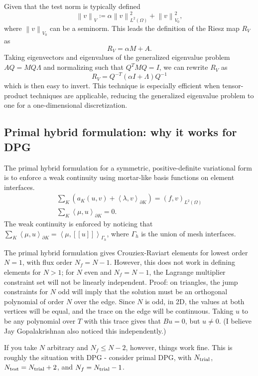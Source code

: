 \documentclass{article}
\newcommand{\nor}[1]{\left\| #1 \right\|}
\newcommand{\LRp}[1]{\left( #1 \right)}
\newcommand{\LRs}[1]{\left[ #1 \right]}
\newcommand{\LRa}[1]{\left\langle #1 \right\rangle}
\newcommand{\jump}[1] {\ensuremath{\LRs{\![#1]\!}}}
\renewcommand{\L}{L^2\LRp{\Omega}}
\begin{document}
Given that the test norm is typically defined
\[
\nor{v}_V \coloneqq \alpha\nor{v}_{\L}^2 + \nor{v}_{V_0}^2,
\]
where $\nor{v}_{V_0}$ can be a seminorm.  This leads the definition of the Riesz map $R_V$ as
\[
R_V = \alpha M + A.
\]
Taking eigenvectors and eigenvalues of the generalized eigenvalue problem $AQ = MQ \Lambda$ and normalizing such that $Q^TMQ = I$, we can rewrite $R_V$ as
\[
R_V = Q^{-T} (\alpha I + \Lambda) Q^{-1}
\]
which is then easy to invert.  This technique is especially efficient when tensor-product techniques are applicable, reducing the generalized eigenvalue problem to one for a one-dimensional discretization.  

\subsection{Primal hybrid formulation: why it works for DPG}

The primal hybrid formulation for a symmetric, positive-definite variational form is to enforce a weak continuity using mortar-like basis functions on element interfaces.
\begin{align*}
\sum_K (a_K(u,v) + \LRa{\lambda, v}_{\partial K}) = (f,v)_{\L}\\
\sum_K \LRa{\mu, u}_{\partial K} = 0.
\end{align*}
The weak continuity is enforced by noticing that $\sum_K \LRa{\mu, u}_{\partial K} = \LRa{\mu,\jump{u}}_{\Gamma_h}$, where $\Gamma_h$ is the union of mesh interfaces.

The primal hybrid formulation gives Crouziex-Raviart elements for lowest order $N=1$, with flux order $N_f = N-1$.  However, this does not work in defining elements for $N>1$; for $N$ even and $N_f = N-1$, the Lagrange multiplier constraint set will not be linearly independent.   Proof: on triangles, the jump constraints for $N$ odd will imply that the solution must be an orthogonal polynomial of order $N$ over the edge.  Since $N$ is odd, in 2D, the values at both vertices will be equal, and the trace on the edge will be continuous.  Taking $u$ to be any polynomial over $T$ with this trace gives that $Bu = 0$, but $u\neq 0$.  (I believe Jay Gopalakrishnan also noticed this independently.)

If you take $N$ arbitrary and $N_f \leq N-2$, however, things work fine.  This is roughly the situation with DPG - consider primal DPG, with $N_{\rm trial}$, $N_{\rm test} = N_{\rm trial} + 2$, and $N_f = N_{\rm trial} - 1$.  

%
\end{document}

